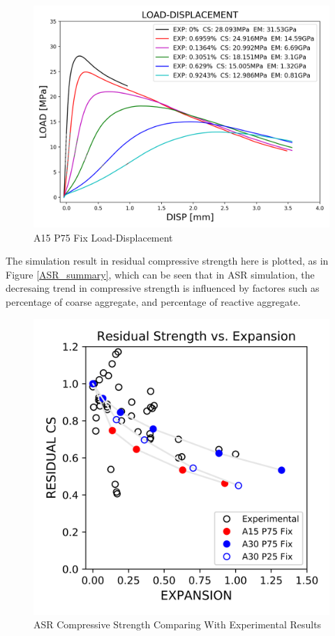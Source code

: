 \begin{figure}[ht]
\centering
\includegraphics[width=.8\linewidth]{Files/exp_3D/ASR/S13A15P75FIX-LOAD-DISPLACEMENT.png}
  \caption{A15 P75 Fix Load-Displacement}
  \label{fig:A15P75FIX_LD}
\end{figure}

\clearpage

The simulation result in residual compressive strength here is plotted, as in Figure \ref{ASR_summary}, which can be seen that in ASR simulation, the decresaing trend in compressive strength is influenced by factores such as percentage of coarse aggregate, and percentage of reactive aggregate.

\begin{figure}[ht!]
\centering
\includegraphics[width=.8\linewidth]{Files/CS_plot/ASRCS_all.png}
  \caption{ASR Compressive Strength Comparing With Experimental Results}
  \label{ASR_CS_summary}
\end{figure}

